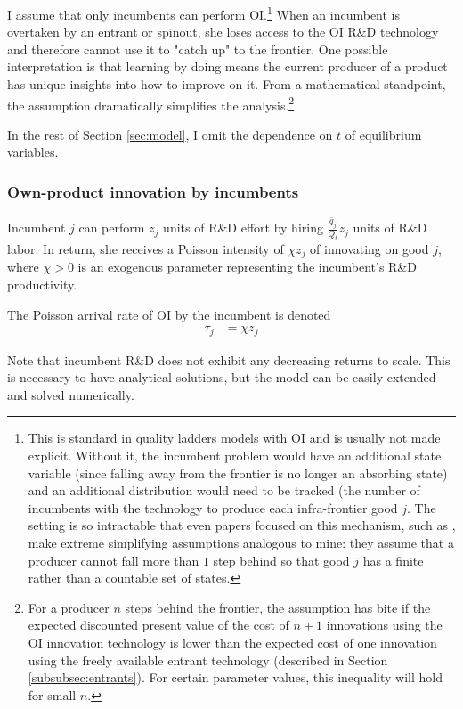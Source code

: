 \documentclass[11pt,english]{article}
\theoremstyle{remark}
\begin{document}
I assume that only incumbents can perform OI.\footnote{This is standard in quality ladders models with OI and is usually not made explicit. Without it, the incumbent problem would have an additional state variable (since falling away from the frontier is no longer an absorbing state) and an additional distribution would need to be tracked (the number of incumbents with the technology to produce each infra-frontier good $j$. The setting is so intractable that even papers focused on this mechanism, such as \cite{aghion_competition_2005}, make extreme simplifying assumptions analogous to mine: they assume that a producer cannot fall more than $1$ step behind so that good $j$ has a finite rather than a countable set of states.} When an incumbent is overtaken by an entrant or spinout, she loses access to the OI R\&D technology and therefore cannot use it to "catch up" to the frontier. One possible interpretation is that learning by doing means the current producer of a product has unique insights into how to improve on it. From a mathematical standpoint, the assumption dramatically simplifies the analysis.\footnote{For a producer $n$ steps behind the frontier, the assumption has bite if the expected discounted present value of the cost of $n + 1$ innovations using the OI innovation technology is lower than the expected cost of one innovation using the freely available entrant technology (described in Section \ref{subsubsec:entrants}). For certain parameter values, this inequality will hold for small $n$.}  

In the rest of Section \ref{sec:model}, I omit the dependence on $t$ of equilibrium variables. 

\subsubsection{Own-product innovation by incumbents} \label{subsubsec:OI}

Incumbent $j$ can perform $z_j$ units of R\&D effort by hiring $\frac{\bar{q}_{j}}{Q_t}z_j$ units of R\&D labor. In return, she receives a Poisson intensity of $\chi z_j$ of innovating on good $j$, where $\chi > 0$ is an exogenous parameter representing the incumbent's R\&D productivity. 

The Poisson arrival rate of OI by the incumbent is denoted
\begin{align}
	\tau_j &= \chi z_j
\end{align}

Note that incumbent R\&D does not exhibit any decreasing returns to scale. This is necessary to have analytical solutions, but the model can be easily extended and solved numerically.
\end{document}
